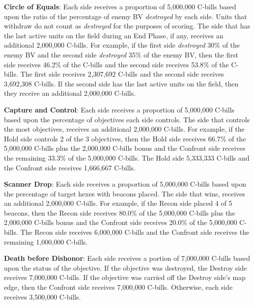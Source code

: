 \begin{description}

\item {\bfseries Circle of Equals}: Each side receives a proportion of 5,000,000 C-bills based upon the ratio of the percentage of enemy BV \emph{destroyed} by each side.
Units that withdraw do not count as \emph{destroyed} for the purposes of scoring.
The side that has the last active units on the field during an End Phase, if any, receives an additional 2,000,000 C-bills.
For example, if the first side \emph{destroyed} 30\% of the enemy BV and the second side \emph{destroyed} 35\% of the enemy BV, then the first side receives 46.2\% of the C-bills and the second side receives 53.8\% of the C-bills.
The first side receives 2,307,692 C-bills and the second side receives 3,692,308 C-bills.
If the second side has the last active units on the field, then they receive an additional 2,000,000 C-bills.

\item {\bfseries Capture and Control}: Each side receives a proportion of 5,000,000 C-bills based upon the percentage of objectives each side controls.
The side that controls the most objectives, receives an additional 2,000,000 C-bills.
For example, if the Hold side controls 2 of the 3 objectives, then the Hold side receives 66.7\% of the 5,000,000 C-bills plus the 2,000,000 C-bills bonus and the Confront side receives the remaining 33.3\% of the 5,000,000 C-bills.
The Hold side 5,333,333 C-bills and the Confront side receives 1,666,667 C-bills.

\item {\bfseries Scanner Drop}: Each side receives a proportion of 5,000,000 C-bills based upon the percentage of target hexes with beacons placed.
The side that wins, receives an additional 2,000,000 C-bills.
For example, if the Recon side placed 4 of 5 beacons, then the Recon side receives 80.0\% of the 5,000,000 C-bills plus the 2,000,000 C-bills bonus and the Confront side receives 20.0\% of the 5,000,000 C-bills.
The Recon side receives 6,000,000 C-bills and the Confront side receives the remaining 1,000,000 C-bills.

\item {\bfseries Death before Dishonor}: Each side receives a portion of 7,000,000 C-bills based upon the status of the objective.
If the objective was destroyed, the Destroy side receives 7,000,000 C-bills.
If the objective was carried off the Destroy side's map edge, then the Confront side receives 7,000,000 C-bills.
Otherwise, each side receives 3,500,000 C-bills.


\end{description}
